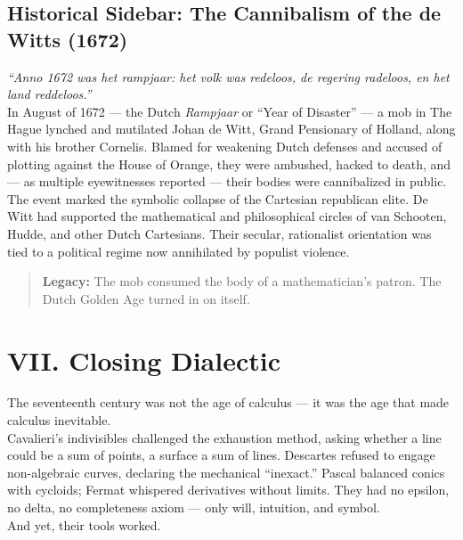 \documentclass[9pt]{article}
\begin{document}
\subsection*{Historical Sidebar: The Cannibalism of the de Witts (1672)}

\textit{“Anno 1672 was het rampjaar: het volk was redeloos, de regering radeloos, en het land reddeloos.”}\\

In August of 1672 — the Dutch \textit{Rampjaar} or “Year of Disaster” — a mob in The Hague lynched and mutilated Johan de Witt, Grand Pensionary of Holland, along with his brother Cornelis. Blamed for weakening Dutch defenses and accused of plotting against the House of Orange, they were ambushed, hacked to death, and — as multiple eyewitnesses reported — their bodies were cannibalized in public.\\

The event marked the symbolic collapse of the Cartesian republican elite. De Witt had supported the mathematical and philosophical circles of van Schooten, Hudde, and other Dutch Cartesians. Their secular, rationalist orientation was tied to a political regime now annihilated by populist violence.\\

\begin{quote}
\textbf{Legacy:} The mob consumed the body of a mathematician’s patron. The Dutch Golden Age turned in on itself.
\end{quote}


\newpage

\section*{VII. Closing Dialectic}

The seventeenth century was not the age of calculus — it was the age that made calculus inevitable.\\

Cavalieri’s indivisibles challenged the exhaustion method, asking whether a line could be a sum of points, a surface a sum of lines. Descartes refused to engage non-algebraic curves, declaring the mechanical “inexact.” Pascal balanced conics with cycloids; Fermat whispered derivatives without limits. They had no epsilon, no delta, no completeness axiom — only will, intuition, and symbol.\\

And yet, their tools worked.\\
\end{document}
